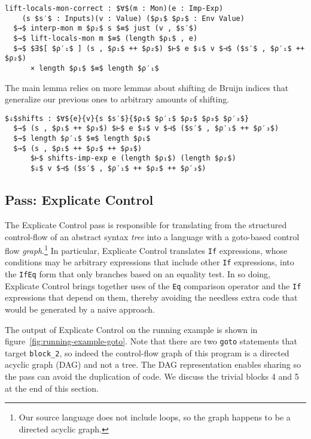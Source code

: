 \documentclass[sigplan,review,dvipsnames,screen,10pt]{acmart}
\begin{document}
\begin{lstlisting}
lift-locals-mon-correct : $∀$(m : Mon)(e : Imp-Exp)
    (s $s′$ : Inputs)(v : Value) ($ρ₁$ $ρ₂$ : Env Value)
  $→$ interp-mon m $ρ₂$ s $≡$ just (v , $s′$)
  $→$ lift-locals-mon m $≡$ (length $ρ₁$ , e)
  $→$ $∃$[ $ρ′₁$ ] (s , $ρ₁$ ++ $ρ₂$) $⊢$ e $⇓$ v $⊣$ ($s′$ , $ρ′₁$ ++ $ρ₂$)
      × length $ρ₁$ $≡$ length $ρ′₁$
\end{lstlisting}

The main lemma relies on more lemmas about shifting de Bruijn indices
that generalize our previous ones to arbitrary amounts of shifting.

\begin{lstlisting}
$⇓$shifts : $∀${e}{v}{s $s′$}{$ρ₁$ $ρ′₁$ $ρ₂$ $ρ₃$ $ρ′₃$} 
  $→$ (s , $ρ₁$ ++ $ρ₃$) $⊢$ e $⇓$ v $⊣$ ($s′$ , $ρ′₁$ ++ $ρ′₃$)
  $→$ length $ρ′₁$ $≡$ length $ρ₁$
  $→$ (s , $ρ₁$ ++ $ρ₂$ ++ $ρ₃$)
      $⊢$ shifts-imp-exp e (length $ρ₁$) (length $ρ₂$)
      $⇓$ v $⊣$ ($s′$ , $ρ′₁$ ++ $ρ₂$ ++ $ρ′₃$)
\end{lstlisting}


\subsection{Pass: Explicate Control}

The Explicate Control pass is responsible for translating from the
structured control-flow of an abstract syntax \emph{tree} into a
language with a goto-based control flow \emph{graph}.\footnote{Our
source language does not include loops, so the graph happens to be a
directed acyclic graph.} In particular, Explicate Control translates
\lstinline{If} expressions, whose conditions may be arbitrary
expressions that include other \lstinline{If} expressions, into the
\lstinline{IfEq} form that only branches based on an equality test. In
so doing, Explicate Control brings together uses of the \lstinline{Eq}
comparison operator and the \lstinline{If} expressions that depend on
them, thereby avoiding the needless extra code that would be generated
by a naive approach.

The output of Explicate Control on the running example is shown in
figure~\ref{fig:running-example-goto}. Note that there are two
\lstinline{goto} statements that target \lstinline{block_2}, so indeed
the control-flow graph of this program is a directed acyclic graph
(DAG) and not a tree. The DAG representation enables sharing so the
pass can avoid the duplication of code. We discuss the trivial blocks
4 and 5 at the end of this section.
\end{document}
